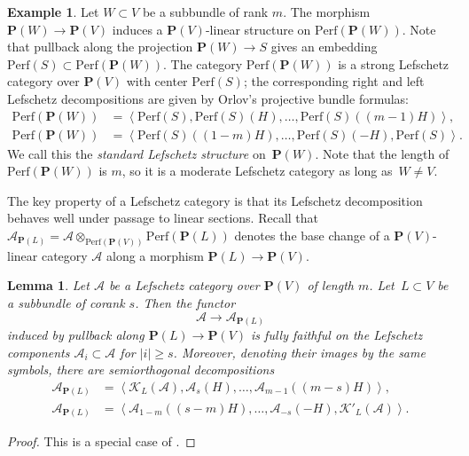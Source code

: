 \documentclass[11pt, reqno]{amsart}
\numberwithin{equation}{section}
\theoremstyle{plain}
\newtheorem{lemma}[theorem]{Lemma}
\theoremstyle{definition}
\newtheorem{example}[theorem]{Example}
\newcommand{\Perf}{\mathrm{Perf}}
\newcommand{\llangle}{\left \langle}
\newcommand{\rrangle}{\right \rangle}
\newcommand{\cA}{\mathcal{A}}
\newcommand{\cK}{\mathcal{K}}
\newcommand{\bP}{\mathbf{P}}
\begin{document}
\begin{example} 
\label{example-projective-bundle-lc}
Let $W \subset V$ be a subbundle of rank $m$. 
The morphism $\bP(W) \to \bP(V)$ induces a $\bP(V)$-linear structure on $\Perf(\bP(W))$. 
Note that pullback along the projection $\bP(W) \to S$ gives an embedding $\Perf(S) \subset \Perf(\bP(W))$. 
The category $\Perf(\bP(W))$ is a strong Lefschetz category over $\bP(V)$ with center 
$\Perf(S)$;  
the corresponding right and left Lefschetz decompositions are 
given by Orlov's projective bundle formulas: 
\begin{align*} 
\Perf(\bP(W)) & = \llangle \Perf(S), \Perf(S)(H), \dots, \Perf(S)((m-1)H)  \rrangle , \\
\Perf(\bP(W)) & = \llangle \Perf(S)((1-m)H), \dots, \Perf(S)(-H), \Perf(S) \rrangle . 
\end{align*} 
We call this the \emph{standard Lefschetz structure} on~$\bP(W)$. 
Note that the length of $\Perf(\bP(W))$ is $m$, so it is a moderate Lefschetz category as long as~$W \neq V$. 
\end{example}

The key property of a Lefschetz category is that its Lefschetz decomposition behaves well 
under passage to linear sections. 
Recall that $\cA_{\bP(L)} = \cA \otimes_{\Perf(\bP(V))} \Perf(\bP(L))$ 
denotes the base change of a $\bP(V)$-linear category $\cA$ along a morphism $\bP(L) \to \bP(V)$.

\begin{lemma}
\label{lemma-linear-section-lc} 
Let $\cA$ be a Lefschetz category over $\bP(V)$ of length $m$. 
Let~$L \subset V$ be a subbundle of corank $s$.  
Then the functor
\begin{equation*}
\cA \to \cA_{\bP(L)} 
\end{equation*}
induced by pullback along $\bP(L) \to \bP(V)$ is fully faithful on the 
Lefschetz components $\cA_i \subset \cA$ for $|i| \geq s$. 
Moreover, denoting their images by the same symbols, 
there are semiorthogonal decompositions 
\begin{align*}
\label{eq:lefschetz-restricted} \cA_{\bP(L)} & = \llangle \cK_L(\cA), \cA_s(H), \dots, \cA_{m-1}((m-s)H) \rrangle ,  \\ 
\cA_{\bP(L)} & = \llangle \cA_{1-m}((s-m)H), \dots,\cA_{-s}(-H), \cK'_{L}(\cA) \rrangle. 
\end{align*}
\end{lemma} 

\begin{proof}
This is a special case of \cite[Lemmas 6.20 and 6.22(3)]{NCHPD}. 
\end{proof}
\end{document}

